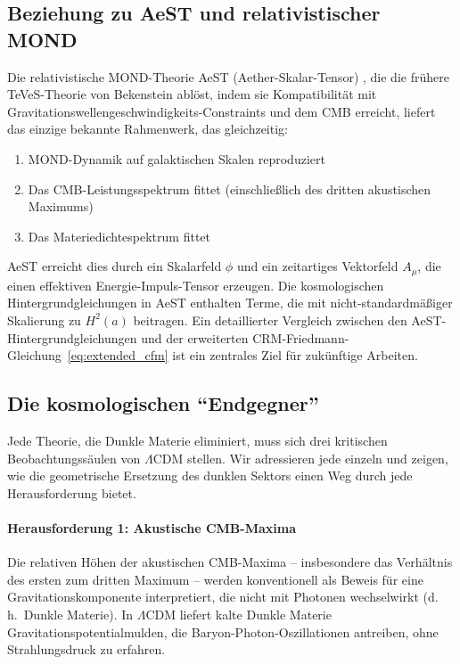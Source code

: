 \documentclass[aps,prd,twocolumn,superscriptaddress,nofootinbib]{revtex4-2}
\begin{document}
\subsection{Beziehung zu AeST und relativistischer MOND}

Die relativistische MOND-Theorie AeST (Aether-Skalar-Tensor) \cite{Skordis2021}, die die fr\"uhere TeVeS-Theorie von Bekenstein \cite{Bekenstein2004} abl\"ost, indem sie Kompatibilit\"at mit Gravitationswellengeschwindigkeits-Constraints und dem CMB erreicht, liefert das einzige bekannte Rahmenwerk, das gleichzeitig:
\begin{enumerate}
\item MOND-Dynamik auf galaktischen Skalen reproduziert
\item Das CMB-Leistungsspektrum fittet (einschlie\ss{}lich des dritten akustischen Maximums)
\item Das Materiedichtespektrum fittet
\end{enumerate}

AeST erreicht dies durch ein Skalarfeld $\phi$ und ein zeitartiges Vektorfeld $A_\mu$, die einen effektiven Energie-Impuls-Tensor erzeugen. Die kosmologischen Hintergrundgleichungen in AeST enthalten Terme, die mit nicht-standardm\"a\ss{}iger Skalierung zu $H^2(a)$ beitragen. Ein detaillierter Vergleich zwischen den AeST-Hintergrundgleichungen und der erweiterten CRM-Friedmann-Gleichung~\eqref{eq:extended_cfm} ist ein zentrales Ziel f\"ur zuk\"unftige Arbeiten.

\subsection{Die kosmologischen "`Endgegner"'}
\label{subsec:endgegner}

Jede Theorie, die Dunkle Materie eliminiert, muss sich drei kritischen Beobachtungss\"aulen von $\Lambda$CDM stellen. Wir adressieren jede einzeln und zeigen, wie die geometrische Ersetzung des dunklen Sektors einen Weg durch jede Herausforderung bietet.

\paragraph{Herausforderung 1: Akustische CMB-Maxima}

Die relativen H\"ohen der akustischen CMB-Maxima -- insbesondere das Verh\"altnis des ersten zum dritten Maximum -- werden konventionell als Beweis f\"ur eine Gravitationskomponente interpretiert, die nicht mit Photonen wechselwirkt (d.\,h.\ Dunkle Materie). In $\Lambda$CDM liefert kalte Dunkle Materie Gravitationspotentialmulden, die Baryon-Photon-Oszillationen antreiben, ohne Strahlungsdruck zu erfahren.
\end{document}
